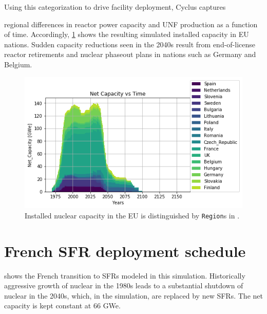 Using this categorization to drive facility deployment, Cyclus captures 

regional differences in reactor power capacity and \gls{UNF} production as a 
function of time. Accordingly, \cref{fig:eu_pow} shows the resulting simulated 
installed capacity in \gls{EU} nations.  Sudden capacity reductions seen in the 
2040s result from end-of-license reactor retirements and nuclear phaseout plans 
in nations such as Germany and Belgium.  

\begin{figure}[htbp!]
    \begin{center}
        \includegraphics[scale=0.7]{./images/eu_future/power_plot.png}
    \end{center}
    \caption{Installed nuclear capacity in the EU is distinguished by \texttt{Region}s in \Cyclus.}
    \label{fig:eu_pow}
\end{figure}



\section{French \gls{SFR} deployment schedule}

shows
the French transition to \glspl{SFR} modeled in this simulation.
Historically aggressive growth of nuclear in the 1980s leads to a substantial 
shutdown of nuclear in the 2040s, which, in the simulation, are replaced by new 
\glspl{SFR}. The net capacity is kept constant at 66 GWe.

